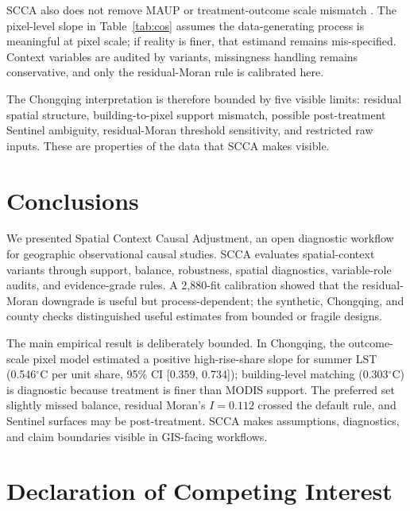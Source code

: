 \documentclass{article}
\begin{document}
SCCA also does not remove MAUP or treatment-outcome scale mismatch \citep{openshaw1984maup,fotheringham1991modifiable}. The pixel-level slope in Table~\ref{tab:cos} assumes the data-generating process is meaningful at pixel scale; if reality is finer, that estimand remains mis-specified. Context variables are audited by variants, missingness handling remains conservative, and only the residual-Moran rule is calibrated here.

The Chongqing interpretation is therefore bounded by five visible limits: residual spatial structure, building-to-pixel support mismatch, possible post-treatment Sentinel ambiguity, residual-Moran threshold sensitivity, and restricted raw inputs. These are properties of the data that SCCA makes visible.

\section{Conclusions}
\label{sec:conclusions}

We presented Spatial Context Causal Adjustment, an open diagnostic workflow for geographic observational causal studies. SCCA evaluates spatial-context variants through support, balance, robustness, spatial diagnostics, variable-role audits, and evidence-grade rules. A 2{,}880-fit calibration showed that the residual-Moran downgrade is useful but process-dependent; the synthetic, Chongqing, and county checks distinguished useful estimates from bounded or fragile designs.

The main empirical result is deliberately bounded. In Chongqing, the outcome-scale pixel model estimated a positive high-rise-share slope for summer LST (0.546$^\circ$C per unit share, 95\% CI [0.359, 0.734]); building-level matching (0.303$^\circ$C) is diagnostic because treatment is finer than MODIS support. The preferred set slightly missed balance, residual Moran's $I = 0.112$ crossed the default rule, and Sentinel surfaces may be post-treatment. SCCA makes assumptions, diagnostics, and claim boundaries visible in GIS-facing workflows.


\section*{Declaration of Competing Interest}
\end{document}
